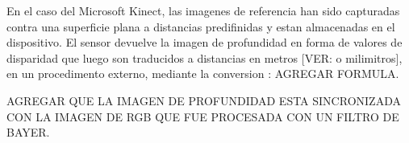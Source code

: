 En el caso del Microsoft Kinect, las imagenes de referencia han sido capturadas contra una superficie plana a distancias predifinidas y estan almacenadas en el dispositivo. El sensor devuelve la imagen de profundidad en forma de valores de disparidad que luego son traducidos a distancias en metros [VER: o milimitros], en un procedimento externo, mediante la conversion : AGREGAR FORMULA.

AGREGAR QUE LA IMAGEN DE PROFUNDIDAD ESTA SINCRONIZADA CON LA IMAGEN DE RGB QUE FUE PROCESADA CON UN FILTRO DE BAYER.